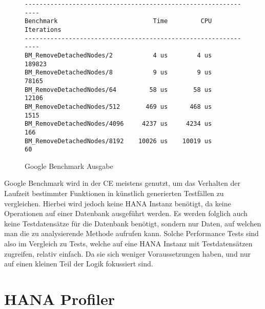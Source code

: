 \begin{figure}[h]
    \begin{center}
        \begin{verbatim}
---------------------------------------------------------------
Benchmark                          Time         CPU Iterations
---------------------------------------------------------------
BM_RemoveDetachedNodes/2           4 us        4 us     189823 
BM_RemoveDetachedNodes/8           9 us        9 us      78165 
BM_RemoveDetachedNodes/64         58 us       58 us      12106 
BM_RemoveDetachedNodes/512       469 us      468 us       1515 
BM_RemoveDetachedNodes/4096     4237 us     4234 us        166 
BM_RemoveDetachedNodes/8192    10026 us    10019 us         60 
        \end{verbatim}
    \end{center}
    \caption{Google Benchmark Ausgabe}\label{fig:google_benchmark_ausgabe}
\end{figure}

Google Benchmark wird in der \ac{CE} meistens genutzt, um das Verhalten der
Laufzeit bestimmter Funktionen in künstlich generierten Testfällen zu
vergleichen. Hierbei wird jedoch keine HANA Instanz benötigt, da
keine Operationen auf einer Datenbank ausgeführt werden. Es werden folglich
auch keine Testdatensätze für die Datenbank benötigt, sondern nur Daten, auf
welchen man die zu analysierende Methode aufrufen kann. Solche Performance
Tests sind also im Vergleich zu Tests, welche auf eine HANA Instanz mit
Testdatensätzen zugreifen, relativ einfach. Da sie sich weniger Voraussetzungen
haben, und nur auf einen kleinen Teil der Logik fokussiert sind.

\section{HANA Profiler}
\label{sec:hana_profiler}
